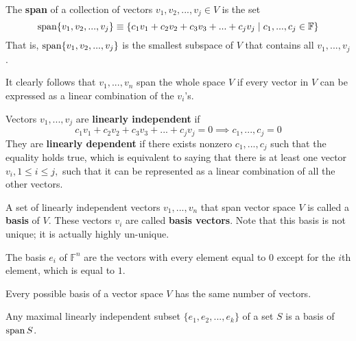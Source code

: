   \begin{definition}[Span]
    The \textbf{span} of a collection of vectors $v_1, v_2, ..., v_j \in V$ is the set
    \begin{equation}
      \Span \{ v_1, v_2, ..., v_j \} \equiv \{ c_1 v_1 + c_2 v_2 + c_3 v_3 + ... + c_j v_j\; | \; c_1, ..., c_j \in \mathbb{F}\}
    \end{equation}
    That is, $\Span \{v_1, v_2, ..., v_j\}$ is the smallest subspace of $V$ that contains all $v_1, ..., v_j$. 
  \end{definition}

  It clearly follows that $v_1, ..., v_n$ span the whole space $V$ if every vector in $V$ can be expressed as a linear combination of the $v_i$'s. 

  \begin{definition}
    Vectors $v_1, ..., v_j$ are \textbf{linearly independent} if 
    \begin{equation}
      c_1 v_1 + c_2 v_2 + c_3 v_3 + ... + c_j v_j = 0 \implies c_1, ..., c_j = 0
    \end{equation}
    They are \textbf{linearly dependent} if there exists nonzero $c_1, ..., c_j$ such that the equality holds true, which is equivalent to saying that there is at least one vector $v_i, 1 \leq i \leq j,$ such that it can be represented as a linear combination of all the other vectors. 
  \end{definition}

  \begin{definition}[Basis]
    A set of linearly independent vectors $v_1, ..., v_n$ that span vector space $V$ is called a \textbf{basis} of $V$. These vectors $v_i$ are called \textbf{basis vectors}. Note that this basis is not unique; it is actually highly un-unique. 
  \end{definition}

  \begin{example}
    The basis $e_i$ of $\mathbb{F}^n$ are the vectors with every element equal to $0$ except for the $i$th element, which is equal to $1$. 
  \end{example}

  \begin{proposition}
    Every possible basis of a vector space $V$ has the same number of vectors.
  \end{proposition}

  \begin{proposition}
    Any maximal linearly independent subset $\{ e_1, e_2, ..., e_k\}$ of a set $S$ is a basis of $\Span S$. 
  \end{proposition}

